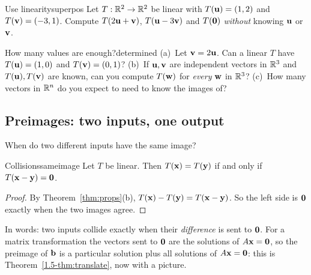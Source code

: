 \documentclass[11pt]{article}
\begin{document}
\begin{kc}{Use linearity}{superpos}
Let $T:\mathbb{R}^2\to\mathbb{R}^2$ be linear with $T(\mathbf{u})=(1,2)$ and $T(\mathbf{v})=(-3,1)$. Compute $T(2\mathbf{u}+\mathbf{v})$, $T(\mathbf{u}-3\mathbf{v})$ and $T(\mathbf{0})$ \emph{without} knowing $\mathbf{u}$ or $\mathbf{v}$.
\end{kc}

\begin{think}{How many values are enough?}{determined}
(a)~Let $\mathbf{v}=2\mathbf{u}$. Can a linear $T$ have $T(\mathbf{u})=(1,0)$ and $T(\mathbf{v})=(0,1)$? (b)~If $\mathbf{u},\mathbf{v}$ are independent vectors in $\mathbb{R}^3$ and $T(\mathbf{u}),T(\mathbf{v})$ are known, can you compute $T(\mathbf{w})$ for \emph{every} $\mathbf{w}$ in $\mathbb{R}^3$? (c)~How many vectors in $\mathbb{R}^n$ do you expect to need to know the images of?
\end{think}

\subsection*{Preimages: two inputs, one output}

When do two different inputs have the same image?

\begin{thm}{Collisions}{sameimage}
Let $T$ be linear. Then $T(\mathbf{x})=T(\mathbf{y})$ if and only if $T(\mathbf{x}-\mathbf{y})=\mathbf{0}$.
\end{thm}

\begin{proof}
By Theorem~\ref{thm:props}(b), $T(\mathbf{x})-T(\mathbf{y})=T(\mathbf{x}-\mathbf{y})$. So the left side is $\mathbf{0}$ exactly when the two images agree.
\end{proof}

In words: two inputs collide exactly when their \emph{difference} is sent to $\mathbf{0}$. For a matrix transformation the vectors sent to $\mathbf{0}$ are the solutions of $A\mathbf{x}=\mathbf{0}$, so the preimage of $\mathbf{b}$ is a particular solution plus all solutions of $A\mathbf{x}=\mathbf{0}$: this is Theorem~\ref{1.5-thm:translate}, now with a picture.
\end{document}
